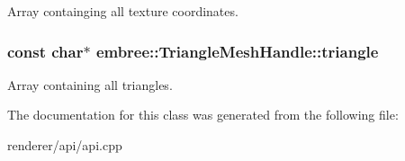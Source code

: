 Array containging all texture coordinates. 

\hypertarget{classembree_1_1_triangle_mesh_handle_a8d27b047269688cfdadbb8088aa9430d}{
\subsubsection[{triangle}]{\setlength{\rightskip}{0pt plus 5cm}const char$\ast$ {\bf embree::TriangleMeshHandle::triangle}}}
\label{classembree_1_1_triangle_mesh_handle_a8d27b047269688cfdadbb8088aa9430d}


Array containing all triangles. 



The documentation for this class was generated from the following file:\begin{DoxyCompactItemize}
\item 
renderer/api/api.cpp\end{DoxyCompactItemize}
